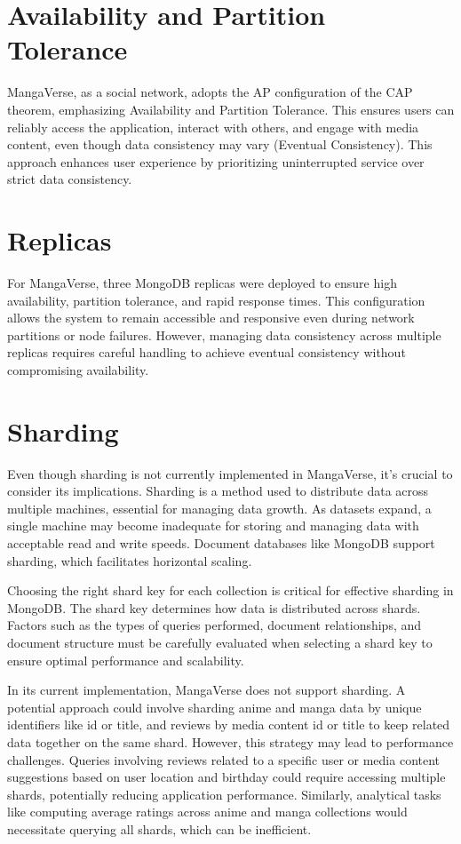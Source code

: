 \section*{Availability and Partition Tolerance}

MangaVerse, as a social network, adopts the AP configuration of the CAP theorem, emphasizing Availability 
and Partition Tolerance. This ensures users can reliably access the application, interact with others, 
and engage with media content, even though data consistency may vary (Eventual Consistency). 
This approach enhances user experience by prioritizing uninterrupted service over strict data consistency.

\section*{Replicas}

For MangaVerse, three MongoDB replicas were deployed to ensure high availability, partition tolerance, 
and rapid response times. This configuration allows the system to remain accessible and responsive even 
during network partitions or node failures. However, managing data consistency across multiple replicas 
requires careful handling to achieve eventual consistency without compromising availability.

\section*{Sharding}

Even though sharding is not currently implemented in MangaVerse, it's crucial to consider its implications. 
Sharding is a method used to distribute data across multiple machines, essential for managing data growth. 
As datasets expand, a single machine may become inadequate for storing and managing data with acceptable 
read and write speeds. Document databases like MongoDB support sharding, which facilitates horizontal scaling.

\vspace{\baselineskip}

Choosing the right shard key for each collection is critical for effective sharding in MongoDB\@. 
The shard key determines how data is distributed across shards. Factors such as the types of queries performed, 
document relationships, and document structure must be carefully evaluated when selecting a shard key to ensure 
optimal performance and scalability.

\vspace{\baselineskip}

In its current implementation, MangaVerse does not support sharding. A potential approach could involve sharding 
anime and manga data by unique identifiers like id or title, and reviews by media content id or title to keep 
related data together on the same shard. However, this strategy may lead to performance challenges. Queries 
involving reviews related to a specific user or media content suggestions based on user location and birthday 
could require accessing multiple shards, potentially reducing application performance. Similarly, analytical 
tasks like computing average ratings across anime and manga collections would necessitate querying all shards, 
which can be inefficient.